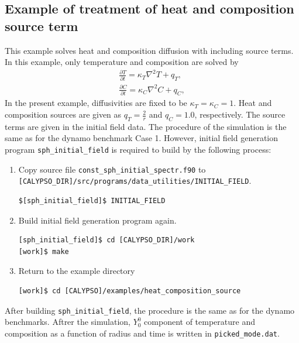 \subsection{Example of treatment of heat and composition source term}
This example solves heat and composition diffusion with including source terms. In this example, only temperature and composition are solved by
%
\begin{eqnarray}
\frac{\partial T}{\partial t} =  \kappa_{T} \nabla^{2} T + q_{T},
\nonumber \\
\frac{\partial C}{\partial t} = \kappa_{C} \nabla^{2} C + q_{C},
\nonumber
\end{eqnarray}
%
 In the present example, diffusivities are fixed to be $\kappa_{T} = \kappa_{C} = 1$. Heat and composition sources are given as
$q_{T} = \frac{2}{r}$ and $q_{C} = 1.0$, respectively. The source terms are given in the initial field data. The procedure of the simulation is the same as for the dynamo benchmark Case 1. However, initial field generation program \verb|sph_initial_field| is required to build by the following process:

\begin{enumerate}
\item Copy source file \verb|const_sph_initial_spectr.f90| to \\
 \verb|[CALYPSO_DIR]/src/programs/data_utilities/INITIAL_FIELD|.
\begin{verbatim}
$[sph_initial_field]$ INITIAL_FIELD
\end{verbatim}

\item Build initial field generation program again.
\begin{verbatim}
[sph_initial_field]$ cd [CALYPSO_DIR]/work
[work]$ make
\end{verbatim}

\item Return to the example directory
\begin{verbatim}
[work]$ cd [CALYPSO]/examples/heat_composition_source
\end{verbatim}

\end{enumerate}
After building \verb|sph_initial_field|, the procedure is the same as for the dynamo benchmarks. Aftrer the simulation, $Y_{0}^{0}$ component of temperature and composition as a function of radius and time is written in \verb|picked_mode.dat|.


